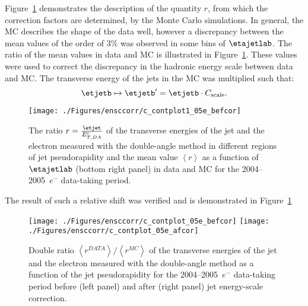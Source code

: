 Figure~\ref{fig:ratcalibcontrolplot} demonstrates the description of the quantity $r$, from which the correction factors are determined, by the Monte Carlo simulations. In general, the MC describes the shape of the data well, however a discrepancy between the mean values of the order of 3\% was observed in some bins of $\etajetlab$. The ratio of the mean values in data and MC is illustrated in Figure~\ref*{fig:ratcalibcontrolplot}. These values were used to correct the discrepancy in the hadronic energy scale between data and MC. The transverse energy of the jets in the MC was multiplied such that:
\begin{equation}
 \etjetb \mapsto \etjetb' = \etjetb \cdot C_\text{scale}.
\end{equation}
\begin{figure}[htbp]
	\centering
		\texttt{[image: ./Figures/ensccorr/c\_contplot1\_05e\_befcor]} 
	\caption{The ratio $r=\frac{\etjet}{E_{T,DA}^e}$ of the transverse energies of the jet and the electron measured with the double-angle method in different regions of jet pseudorapidity \etajetlab and the mean value $\left\langle r\right\rangle$ as a function of $\etajetlab$ (bottom right panel) in data and MC for the 2004--2005~$e^-$ data-taking period.}
	\label{fig:ratcalibcontrolplot}
\end{figure}
The result of such a relative shift was verified and is demonstrated in Figure~\ref*{fig:ratcalibcontrolplot}
\begin{figure}[htbp]
	\centering
		\texttt{[image: ./Figures/ensccorr/c\_contplot\_05e\_befcor]} 
		\texttt{[image: ./Figures/ensccorr/c\_contplot\_05e\_afcor]} 
	\caption{Double ratio $\left\langle r^{DATA}\right\rangle/\left\langle r^{MC}\right\rangle$ of the transverse energies of the jet and the electron measured with the double-angle method as a function of the jet pseudorapidity for the 2004--2005~$e^-$ data-taking period before (left panel) and after (right panel) jet energy-scale correction.}
	\label{fig:doubleratcalib}
\end{figure}

